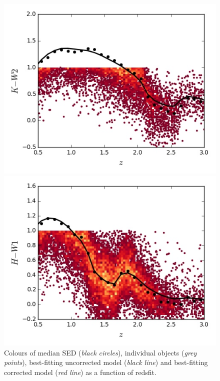\begin{figure}
\begin{minipage}[b]{0.49\textwidth}
    \includegraphics[width=\textwidth]{figures/chapter06/sed_color_plots/kw2.jpg}
  \end{minipage}
  \begin{minipage}[b]{0.49\textwidth}
    \includegraphics[width=\textwidth]{figures/chapter06/sed_color_plots/hw1.jpg}
  \end{minipage} 
  \caption{Colours of median SED ({\it black circles}), individual objects ({\it grey points}), best-fitting uncorrected model ({\it black line}) and best-fitting corrected model ({\it red line}) as a function of redsfit.}
  \label{fig:colorplots}
\end{figure}

